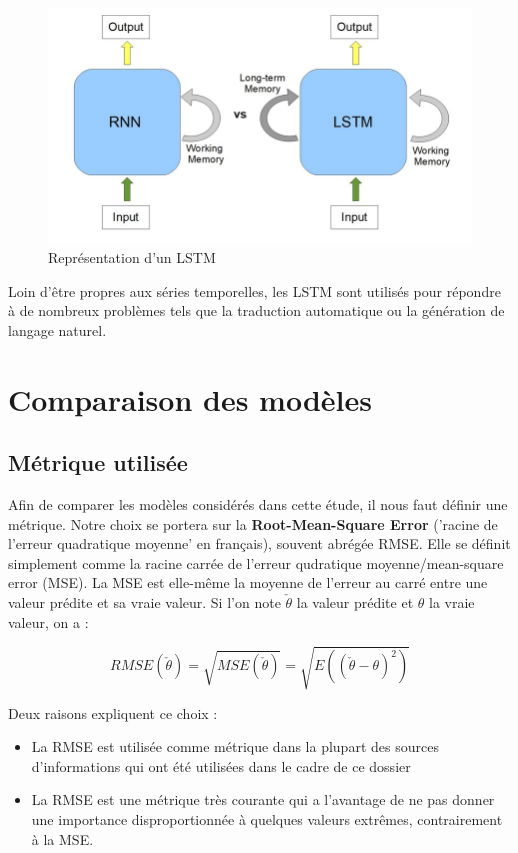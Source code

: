 \documentclass[french]{article}
\begin{document}
    
    \begin{figure}[h]
        \includegraphics[width=12cm]{RNNvsLSTM}
        \centering
        \caption{Représentation d'un LSTM}
        \centering
    \end{figure}

    Loin d'être propres aux séries temporelles, les LSTM sont utilisés pour répondre à de nombreux problèmes tels que la traduction automatique ou la génération de langage naturel.

    \section{Comparaison des modèles}

    \subsection{Métrique utilisée}
    
    Afin de comparer les modèles considérés dans cette étude, il nous faut définir une métrique. Notre choix se portera sur la \textbf{Root-Mean-Square Error} ('racine de l'erreur quadratique moyenne' en français), souvent abrégée RMSE. Elle se définit simplement comme la racine carrée de l'erreur qudratique moyenne/mean-square error (MSE). La MSE est elle-même la moyenne de l'erreur au carré entre une valeur prédite et sa vraie valeur. Si l'on note $\check{\theta}$ la valeur prédite et $\theta$ la vraie valeur, on a :
    
    \begin{equation}RMSE(\check{\theta}) =  \sqrt{MSE(\check{\theta})} = \sqrt{E((\check{\theta} - \theta)^2)}\end{equation}

    Deux raisons expliquent ce choix :
    \begin{itemize}
        \item La RMSE est utilisée comme métrique dans la plupart des sources d'informations qui ont été utilisées dans le cadre de ce dossier
        \item La RMSE est une métrique très courante qui a l'avantage de ne pas donner une importance disproportionnée à quelques valeurs extrêmes, contrairement à la MSE.
    \end{itemize}
\end{document}

